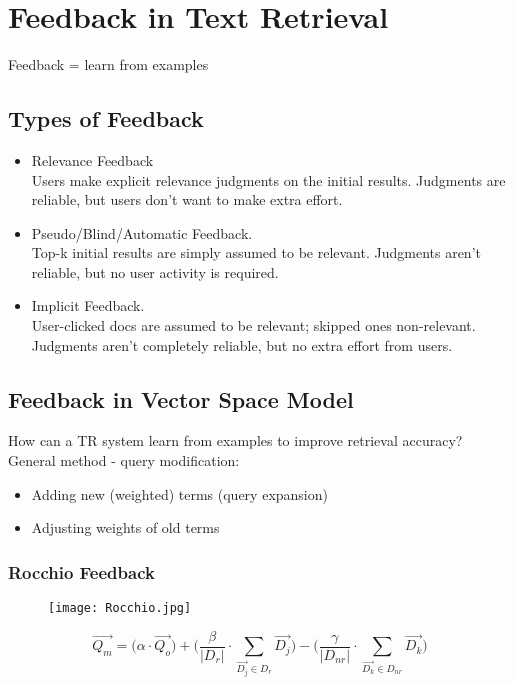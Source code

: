 \newpage
\section{Feedback in Text Retrieval}

Feedback = learn from examples

\subsection{Types of Feedback}
\begin{itemize}
\item Relevance Feedback \\ Users make explicit relevance judgments on the initial results. Judgments are reliable, but users don’t want to make extra effort.
\item Pseudo/Blind/Automatic Feedback. \\ Top-k initial results are simply assumed to be relevant. Judgments aren’t reliable, but no user activity is required.
\item Implicit Feedback. \\ User-clicked docs are assumed to be relevant; skipped ones non-relevant. Judgments aren’t completely reliable, but no extra effort from users.
\end{itemize}


\subsection{Feedback in Vector Space Model}

How can a TR system learn from examples to improve retrieval accuracy? General method - query modification:
\begin{itemize}
\item Adding new (weighted) terms (query expansion)
\item Adjusting weights of old terms
\end{itemize}


\subsubsection{Rocchio Feedback}
\begin{figure}[H]
    \centering
    \texttt{[image: Rocchio.jpg]}
\end{figure}

\begin{equation*}
\overrightarrow{Q_m} = \bigl(\alpha \cdot \overrightarrow{Q_o} \bigr) + \biggl( \frac{\beta}{|D_r|} \cdot \sum_{\overrightarrow{D_j} \in D_r} \overrightarrow{D_j} \biggr)
- \biggl(\frac{\gamma}{|D_{nr}|} \cdot \sum_{\overrightarrow{D_k} \in D_{nr}} \overrightarrow{D_k} \biggr) 
\end{equation*}

